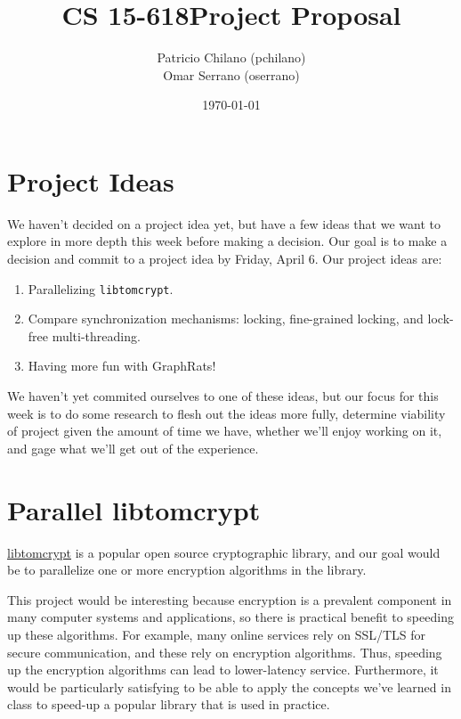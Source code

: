 \documentclass[11pt]{article}
\title{\vspace{-25pt}
\huge CS 15-618\hfill Project Proposal}
\author{
    Patricio Chilano (pchilano) \\
    Omar Serrano (oserrano)
}
\date{\today}
\begin{document}


\maketitle

\section*{Project Ideas}

We haven't decided on a project idea yet, but have a few ideas that we want to
explore in more depth this week before making a decision. Our goal is to make a
decision and commit to a project idea by Friday, April 6. Our project ideas are:

\begin{enumerate}
\item
Parallelizing \texttt{libtomcrypt}.
\item
Compare synchronization mechanisms: locking, fine-grained locking, and lock-free
multi-threading.
\item
Having more fun with GraphRats!
\end{enumerate}

We haven't yet commited ourselves to one of these ideas, but our focus for this
week is to do some research to flesh out the ideas more fully, determine
viability of project given the amount of time we have, whether we'll enjoy
working on it, and gage what we'll get out of the experience.

\section*{Parallel libtomcrypt}

\href{https://github.com/libtom/libtomcrypt}{libtomcrypt} is a popular open
source cryptographic library, and our goal would be to parallelize one or more
encryption algorithms in the library.

This project would be interesting because encryption is a prevalent component in
many computer systems and applications, so there is practical benefit to
speeding up these algorithms. For example, many online services rely on SSL/TLS
for secure communication, and these rely on encryption algorithms. Thus,
speeding up the encryption algorithms can lead to lower-latency service.
Furthermore, it would be particularly satisfying to be able to apply the
concepts we've learned in class to speed-up a popular library that is used in
practice.
\end{document}
